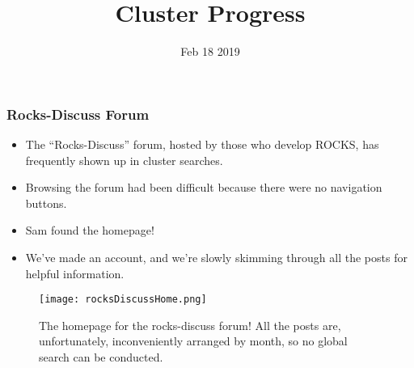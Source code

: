 \documentclass{beamer}
\title{Cluster Progress}
\date{Feb 18 2019}
\begin{document}

\begin{frame}
  \maketitle
\end{frame}



\begin{frame}

  \frametitle{Rocks-Discuss Forum}

  \begin{itemize}
  \item The ``Rocks-Discuss'' forum, hosted by those who develop ROCKS, has
    frequently shown up in cluster searches.
    \item Browsing the forum had been difficult because there were no navigation
      buttons.
    \item Sam found the homepage!
    \item We've made an account, and we're slowly skimming through all the posts
      for helpful information.
  \end{itemize}

  \begin{figure}[H]
    \begin{center}
      \texttt{[image: rocksDiscussHome.png]}
    \end{center}
    \caption{The homepage for the rocks-discuss forum! All the posts are,
      unfortunately, inconveniently arranged by month, so no global search can
      be conducted.}
  \end{figure}

\end{frame}

\end{document}
